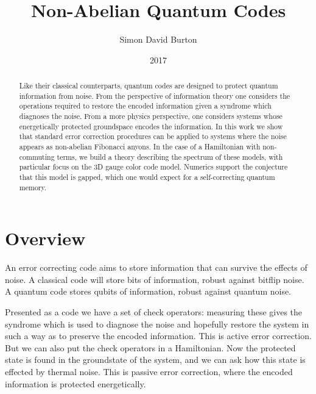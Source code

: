 \documentclass[11pt,oneside]{report}
\title{Non-Abelian Quantum Codes}
\author{Simon David Burton}
\date{2017}
\newcommand{\danbrowne}[1]{\ \textcolor{red}{\{#1\}}\ }
\begin{document}

\maketitle


\begin{abstract}
Like their classical counterparts,
quantum codes are designed to protect quantum
information from noise.
From the perspective of information theory
one considers the operations required to restore
the encoded information given a syndrome which
diagnoses the noise.
From a more physics perspective, one considers
systems whose energetically protected groundspace
encodes the information.
In this work we show that standard error correction
procedures can be applied to systems where the
noise appears as non-abelian Fibonacci anyons.
In the case of a Hamiltonian with non-commuting
terms, we build a theory describing the spectrum of
these models,  
with particular focus on the 3D gauge color code model.
Numerics support the conjecture that this model is gapped,
which one would expect for a self-correcting quantum memory.
\end{abstract}

\declaration
\attribution

\dedication{To Arina}

\tableofcontents
\newpage
{}

\setcounter{chapter}{-1}
\chapter{Overview}


An error correcting code aims to store information
that can survive the effects of noise.
A classical code will store bits of information,
robust against bitflip noise.
A quantum code stores qubits of information,
robust against quantum noise.

Presented as a code we have a set of check operators:
measuring these gives the syndrome which is used to 
diagnose the noise and hopefully restore the system
in such a way as to preserve the encoded information.
This is active error correction.
But we can also put the check operators in a Hamiltonian.
Now the protected state is found in the groundstate of
the system, and we can ask how this state is effected
by thermal noise.
This is passive error correction, where the
encoded information is protected energetically.
\end{document}
